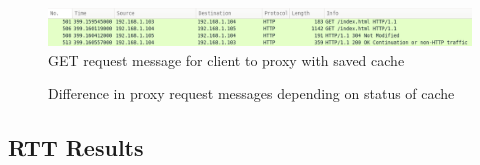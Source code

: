 \documentclass[10pt,twocolumn]{witseiepaper}
\begin{document}
		\begin{figure}[h!]
			\centering
			\includegraphics[width=\columnwidth]{resources/proxy_cache}
			\caption{GET request message for client to proxy with saved cache}
			\label{fig:proxy_cache}
		\end{figure}
		
		\begin{figure}[h!]
			\centering
			 \hspace{1cm}
			\caption{Difference in proxy request messages depending on status of cache}
			\label{fig:proxy_comparrison}
		\end{figure}
		
	\subsection{RTT Results}
	\label{app:rtt}
		
\end{document}

